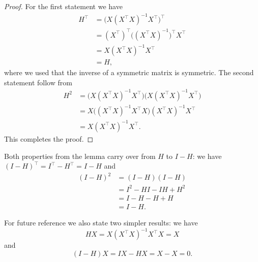 \documentclass[
  a4paper,
]{article}
\theoremstyle{definition}
\theoremstyle{definition}
\theoremstyle{definition}
\theoremstyle{definition}
\theoremstyle{remark}
\begin{document}
\begin{proof}
For the first statement we have
\begin{align*}
  H^\top
  &= \bigl( X (X^\top X)^{-1} X^\top \bigr)^\top \\
  &= (X^\top)^\top \bigl((X^\top X)^{-1}\bigr)^\top X^\top \\
  &= X (X^\top X)^{-1} X^\top \\
  &= H,
\end{align*}
where we used that the inverse of a symmetric matrix is symmetric.
The second statement follow from
\begin{align*}
  H^2
  &= \bigl( X (X^\top X)^{-1} X^\top \bigr) \bigl( X (X^\top X)^{-1} X^\top \bigr) \\
  &= X \bigl( (X^\top X)^{-1} X^\top X \bigr) (X^\top X)^{-1} X^\top \\
  &= X (X^\top X)^{-1} X^\top.
\end{align*}
This completes the proof.
\end{proof}

Both properties from the lemma carry over from \(H\) to \(I - H\): we
have \((I - H)^\top = I^\top - H^\top = I - H\) and
\begin{align*}
  (I - H)^2
  &= (I - H)(I - H) \\
  &= I^2 - HI - IH + H^2 \\
  &= I - H - H + H \\
  &= I - H.
\end{align*}

For future reference we also state two simpler results: we have
\begin{equation}
  H X = X (X^\top X)^{-1} X^\top X = X  \label{eq:XH}
\end{equation}
and
\begin{equation}
  (I - H) X = IX - HX = X - X = 0.  \label{eq:XIH}
\end{equation}
\end{document}
